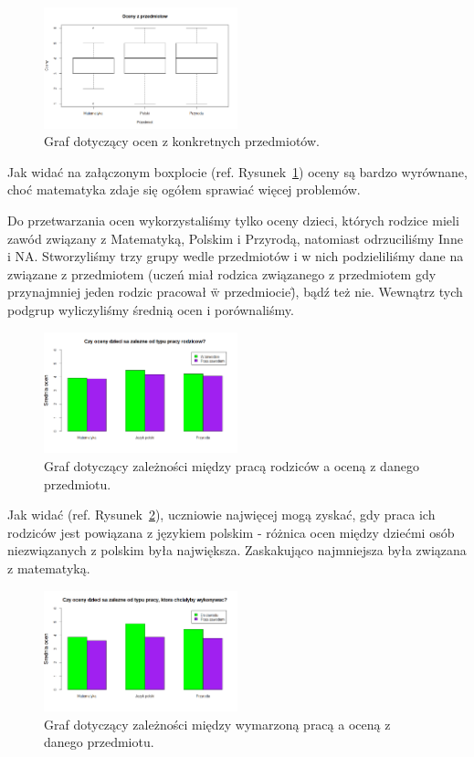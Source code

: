 \documentclass[conference]{IEEEtran}
\begin{document}
\begin{figure}
	\centering
	\includegraphics[width=0.5\textwidth]{8.png}
	\caption{Graf dotyczący ocen z konkretnych przedmiotów.}
	\label{fig:oceny}
\end{figure}

Jak widać na załączonym boxplocie (ref. Rysunek~\ref{fig:oceny}) oceny są bardzo wyrównane, choć matematyka zdaje się ogółem sprawiać więcej problemów.

Do przetwarzania ocen wykorzystaliśmy tylko oceny dzieci, których rodzice mieli zawód związany z Matematyką, Polskim i Przyrodą, natomiast odrzuciliśmy Inne i NA. Stworzyliśmy trzy grupy wedle przedmiotów i w nich podzieliliśmy dane na związane z przedmiotem (uczeń miał rodzica związanego z przedmiotem gdy przynajmniej jeden rodzic pracował \"w przedmiocie\"), bądź też nie. Wewnątrz tych podgrup wyliczyliśmy średnią ocen i porównaliśmy.

\begin{figure}
	\centering
	\includegraphics[width=0.5\textwidth]{9.png}
	\caption{Graf dotyczący zależności między pracą rodziców a oceną z danego przedmiotu.}
	\label{fig:oceny_praca}
\end{figure}

Jak widać (ref. Rysunek~\ref{fig:oceny_praca}), uczniowie najwięcej mogą zyskać, gdy praca ich rodziców jest powiązana z językiem polskim - różnica ocen między dziećmi osób niezwiązanych z polskim była największa. Zaskakująco najmniejsza była związana z matematyką.

\begin{figure}
	\centering
	\includegraphics[width=0.5\textwidth]{10.png}
	\caption{Graf dotyczący zależności między wymarzoną pracą a oceną z danego przedmiotu.}
	\label{fig:oceny_wymarzona}
\end{figure}
\end{document}
